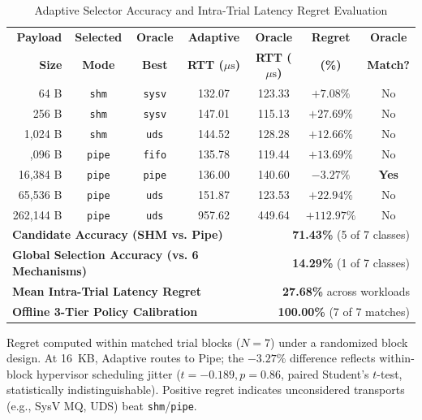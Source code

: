 \begin{table}[!t]
\centering
\caption{Adaptive Selector Accuracy and Intra-Trial Latency Regret Evaluation}
\label{tab:adaptive_results}
\scriptsize
\renewcommand{\arraystretch}{1.08}
\setlength{\tabcolsep}{2.2pt}
\begin{tabular*}{\columnwidth}{@{\extracolsep{\fill}}rcccccc}
\toprule
\textbf{Payload} & \textbf{Selected} & \textbf{Oracle} & \textbf{Adaptive} & \textbf{Oracle} & \textbf{Regret} & \textbf{Oracle} \\
\textbf{Size} & \textbf{Mode} & \textbf{Best} & \textbf{RTT ($\mu\text{s}$)} & \textbf{RTT ($\mu\text{s}$)} & \textbf{(\%)} & \textbf{Match?} \\
\midrule
64 B & \texttt{shm} & \texttt{sysv} & 132.07 & 123.33 & $+7.08\%$ & No \\
256 B & \texttt{shm} & \texttt{sysv} & 147.01 & 115.13 & $+27.69\%$ & No \\
1,024 B & \texttt{shm} & \texttt{uds} & 144.52 & 128.28 & $+12.66\%$ & No \\
\addlinespace[1.5pt]
4,096 B & \texttt{pipe} & \texttt{fifo} & 135.78 & 119.44 & $+13.69\%$ & No \\
16,384 B & \texttt{pipe} & \texttt{pipe} & 136.00 & 140.60 & $-3.27\%$ & \textbf{Yes} \\
65,536 B & \texttt{pipe} & \texttt{uds} & 151.87 & 123.53 & $+22.94\%$ & No \\
262,144 B & \texttt{pipe} & \texttt{uds} & 957.62 & 449.64 & $+112.97\%$ & No \\
\midrule
\multicolumn{4}{l}{\textbf{Candidate Accuracy (SHM vs. Pipe)}} & \multicolumn{3}{r}{\textbf{71.43\%} (5 of 7 classes)} \\
\multicolumn{4}{l}{\textbf{Global Selection Accuracy (vs. 6 Mechanisms)}} & \multicolumn{3}{r}{\textbf{14.29\%} (1 of 7 classes)} \\
\multicolumn{4}{l}{\textbf{Mean Intra-Trial Latency Regret}} & \multicolumn{3}{r}{\textbf{27.68\%} across workloads} \\
\multicolumn{4}{l}{\textbf{Offline 3-Tier Policy Calibration}} & \multicolumn{3}{r}{\textbf{100.00\%} (7 of 7 matches)} \\
\bottomrule
\end{tabular*}
\vskip 2pt
{\tiny\noindent Regret computed within matched trial blocks ($N=7$) under a randomized block design. At 16~KB, Adaptive routes to Pipe; the $-3.27\%$ difference reflects within-block hypervisor scheduling jitter ($t = -0.189, p=0.86$, paired Student's $t$-test, statistically indistinguishable). Positive regret indicates unconsidered transports (e.g., SysV MQ, UDS) beat \texttt{shm}/\texttt{pipe}.\par}
\end{table}